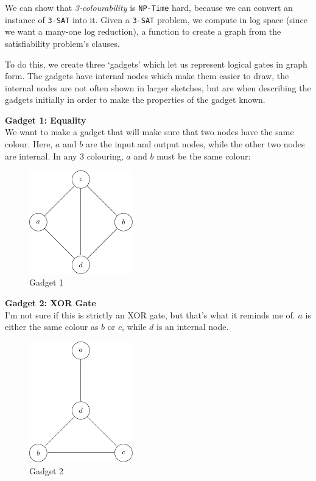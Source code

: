 We can show that \textit{3-colourability} is \texttt{NP-Time} hard, because we
can convert an instance of \texttt{3-SAT} into it. Given a \texttt{3-SAT}
problem, we compute in log space (since we want a many-one log reduction), a
function to create a graph from the satisfiability problem's clauses.

To do this, we create three `gadgets' which let us represent logical gates in
graph form. The gadgets have internal nodes which make them easier to draw, the
internal nodes are not often shown in larger sketches, but are when describing
the gadgets initially in order to make the properties of the gadget known.

\begin{description}
  \item \textbf{Gadget 1: Equality}\\
    We want to make a gadget that will make sure that two nodes have the same 
    colour. Here, $a$ and $b$ are the input and output nodes, while the other 
    two nodes are internal. In any $3$ colouring, $a$ and $b$ must be the same  
    colour:

    \begin{figure}[H]
      \centering
      \includegraphics[width=0.4\textwidth]{diagrams/graph11}
      \caption{Gadget 1}
      \label{fig:gadget1}
    \end{figure}

  \item \textbf{Gadget 2: XOR Gate}\\
    I'm not sure if this is strictly an XOR gate, but that's what it reminds me 
    of. $a$ is either the same colour as $b$ or $c$, while $d$ is an internal 
    node.

    \begin{figure}[H]
      \centering
      \includegraphics[width=0.4\textwidth]{diagrams/graph12}
      \caption{Gadget 2}
      \label{fig:gadget2}
    \end{figure}


\end{description}
